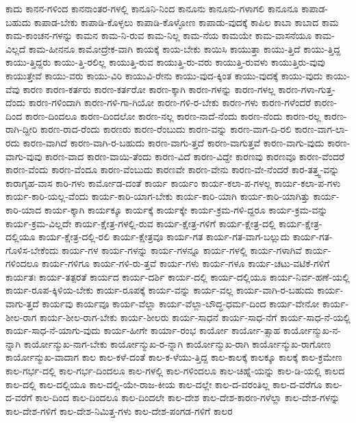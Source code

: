 {ಕಾದು
ಕಾನನ-ಗಳಿಂದ
ಕಾನನಾಂತರ-ಗಳಲ್ಲಿ
ಕಾನೂನಿ-ನಿಂದ
ಕಾನೂನು
ಕಾನೂನು-ಗಳಾಗಲಿ
ಕಾನೂನೂ
ಕಾಪಾಡ-ಬಹುದು
ಕಾಪಾಡ-ಬೇಕು
ಕಾಪಾಡಿ-ಕೊಳ್ಳಲು
ಕಾಪಾಡಿ-ಕೊಳ್ಳೋಣ
ಕಾಪಾಡು-ವುದಕ್ಕೆ
ಕಾಪಿಲ
ಕಾಬಾ
ಕಾಬಾದ
ಕಾಮ
ಕಾಮ-ಕಾಂಚನ-ಗಳನ್ನು
ಕಾಮನ
ಕಾಮ-ನಿ-ರುವ
ಕಾಮ-ನಿಲ್ಲ
ಕಾಮ-ನೆಯ
ಕಾಮಯೇ
ಕಾಮ-ವಾಸನೆಯೂ
ಕಾಮ-ವಿಲ್ಲದೆ
ಕಾಮ-ಹೀನನೂ
ಕಾಮೋದ್ರೇಕ-ವಾಗಿ
ಕಾಯಕ್ಕೆ
ಕಾಯ-ಬೇಕು
ಕಾಯಿಸಿ
ಕಾಯುತ್ತಾ
ಕಾಯು-ತ್ತಿದೆ
ಕಾಯು-ತ್ತಿದ್ದ
ಕಾಯು-ತ್ತಿದ್ದರು
ಕಾಯು-ತ್ತಿ-ರಲಿಲ್ಲ
ಕಾಯುತ್ತಿ-ರುವ
ಕಾಯುತ್ತಿ-ರು-ವರು
ಕಾಯುತ್ತಿ-ರುವಳು
ಕಾಯುತ್ತಿರು-ವುವು
ಕಾಯುತ್ತೇವೆ
ಕಾಯು-ವರು
ಕಾಯು-ವಿರಿ
ಕಾಯುವಿ-ರೇನು
ಕಾಯು-ವುದ-ಕ್ಕಿಂತ
ಕಾಯು-ವುದಕ್ಕೆ
ಕಾಯು-ವುದು
ಕಾಯು-ವೆವು
ಕಾರಣ
ಕಾರಣ-ಕರ್ತರು
ಕಾರಣ-ಕರ್ತರೋ
ಕಾರಣ-ಕ್ಕಾಗಿ
ಕಾರಣ-ಗಳನ್ನು
ಕಾರಣ-ಗಳಲ್ಲ
ಕಾರಣ-ಗಳಾ-ಗುತ್ತ-ದೆಂದು
ಕಾರಣ-ಗಳಿಂದಾಗಿ
ಕಾರಣ-ಗಳಿ-ಗಾ-ಗಿಯೋ
ಕಾರಣ-ಗಳಿ-ರ-ಬೇಕು
ಕಾರಣ-ಗಳು
ಕಾರಣ-ಗಳೆಂದರೆ
ಕಾರಣ-ದಿಂದ
ಕಾರಣ-ದಿಂದಲೂ
ಕಾರಣ-ದಿಂದಲೋ
ಕಾರಣ-ನಲ್ಲ
ಕಾರಣ-ನಾದೆ-ನೆಂದು
ಕಾರಣ-ನೆಂದು
ಕಾರಣ-ರಲ್ಲ
ಕಾರಣ-ರಾಗಿ-ದ್ದೀರಿ
ಕಾರಣ-ರಾದ-ರೆಂದು
ಕಾರಣರು
ಕಾರಣ-ರೆಂಬುದು
ಕಾರಣ-ವನ್ನು
ಕಾರಣ-ವಾಗ-ದಿ-ರಲಿ
ಕಾರಣ-ವಾಗ-ಲಾ-ರದು
ಕಾರಣ-ವಾಗಿದೆ
ಕಾರಣ-ವಾಗಿ-ರ-ಬಹುದು
ಕಾರಣ-ವಾಗು-ತ್ತದೆ
ಕಾರಣ-ವಾಗುತ್ತವೆ
ಕಾರಣ-ವಾಗು-ವುದು
ಕಾರಣ-ವಾಗು-ವುವು
ಕಾರಣ-ವಾದ
ಕಾರಣ-ವಾಯಿ-ತೆಂದು
ಕಾರಣ-ವಿದೆ
ಕಾರಣ-ವಿದ್ದೇ
ಕಾರಣವು
ಕಾರಣವೂ
ಕಾರಣ-ವೆಂದರೆ
ಕಾರಣ-ವೆಂದು
ಕಾರಣ-ವೆಂದೂ
ಕಾರಣ-ವೆಂಬುದು
ಕಾರಣವೇ
ಕಾರಣ-ವೇನು
ಕಾರಣ-ವೇ-ನೆಂದರೆ
ಕಾರ-ತತ್ತ್ವ-ವನ್ನು
ಕಾರಾಗೃಹ-ವಾಸ
ಕಾರಿ-ಗಳು
ಕಾರ್ಮೋಡ-ದಂತೆ
ಕಾರ್ಯ
ಕಾರ್ಯಂ
ಕಾರ್ಯ-ಕಲಾ-ಪ-ಗಳಲ್ಲ
ಕಾರ್ಯ-ಕಲಾ-ಪ-ಗಳು
ಕಾರ್ಯ-ಕಾರಿ-ಯಲ್ಲ-ವೆಂದು
ಕಾರ್ಯ-ಕಾರಿ-ಯಾಗ-ಬೇಕು
ಕಾರ್ಯ-ಕಾರಿ-ಯಾಗಿ
ಕಾರ್ಯ-ಕಾರಿ-ಯಾಗಿತ್ತು
ಕಾರ್ಯ-ಕಾರಿ-ಯಾದ
ಕಾರ್ಯ-ಕ್ಕಾಗಿ
ಕಾರ್ಯಕ್ಕೂ
ಕಾರ್ಯಕ್ಕೆ
ಕಾರ್ಯಕ್ಕೇ
ಕಾರ್ಯ-ಕ್ರಮ-ಗಳಿ-ದ್ದರೂ
ಕಾರ್ಯ-ಕ್ರಮ-ವನ್ನು
ಕಾರ್ಯ-ಕ್ರಮ-ವಿಲ್ಲದೇ
ಕಾರ್ಯ-ಕ್ಷೇತ್ರ-ಗಳಲ್ಲಿ-ರುವ
ಕಾರ್ಯ-ಕ್ಷೇತ್ರ-ಗಳಿಗೆ
ಕಾರ್ಯ-ಕ್ಷೇತ್ರ-ದಲ್ಲಿ
ಕಾರ್ಯ-ಕ್ಷೇತ್ರ-ದಲ್ಲಿಯೂ
ಕಾರ್ಯ-ಕ್ಷೇತ್ರ-ದಲ್ಲಿ-ರಲಿ
ಕಾರ್ಯ-ಕ್ಷೇತ್ರವೂ
ಕಾರ್ಯ-ಗತ
ಕಾರ್ಯ-ಗತ-ವಾಗ-ಬಲ್ಲುದು
ಕಾರ್ಯ-ಗತ-ಗೊಳಿಸ-ಬೇಕೆಂದು
ಕಾರ್ಯ-ಗಳ
ಕಾರ್ಯ-ಗಳನ್ನು
ಕಾರ್ಯ-ಗಳನ್ನೂ
ಕಾರ್ಯ-ಗಳಲ್ಲಿ
ಕಾರ್ಯ-ಗಳಾಗಿವೆ
ಕಾರ್ಯ-ಗಳಿಂದಲೂ
ಕಾರ್ಯ-ಗಳಿಗೂ
ಕಾರ್ಯ-ಗಳಿ-ರು-ತ್ತವೆ
ಕಾರ್ಯ-ಗಳು
ಕಾರ್ಯ-ಗಳೂ
ಕಾರ್ಯ-ಚಟು-ವಟಿಕೆ-ಗಳಿಗೆ
ಕಾರ್ಯತಃ
ಕಾರ್ಯ-ತತ್ಪರತೆ
ಕಾರ್ಯದ
ಕಾರ್ಯ-ದರ್ಶಿ
ಕಾರ್ಯ-ದಲ್ಲಿ
ಕಾರ್ಯ-ದಲ್ಲಿಯೂ
ಕಾರ್ಯ-ನಿರ್ವ-ಹಣೆ-ಯಲ್ಲಿ
ಕಾರ್ಯ-ರೂಪ-ಕ್ಕಿಳಿಯ-ಬೇಕು
ಕಾರ್ಯ-ರೂಪಕ್ಕೆ
ಕಾರ್ಯ-ವನ್ನು
ಕಾರ್ಯ-ವಲ್ಲ
ಕಾರ್ಯ-ವಾಗಿ-ರ-ಬಹುದು
ಕಾರ್ಯ-ವಾಗು-ತ್ತದೆ
ಕಾರ್ಯವು
ಕಾರ್ಯವೂ
ಕಾರ್ಯ-ವೆಲ್ಲಾ
ಕಾರ್ಯ-ವೆಲ್ಲಾ-ಬೌದ್ಧ-ಧರ್ಮ-ದಿಂದ
ಕಾರ್ಯ-ವೇನೋ
ಕಾರ್ಯ-ಶೀಲ-ರಾಗ
ಕಾರ್ಯ-ಶೀಲ-ರಾಗ-ಬೇಕು
ಕಾರ್ಯ-ಶೀಲರು
ಕಾರ್ಯ-ಸಾಧನೆ
ಕಾರ್ಯ-ಸಾಧ-ನೆಗೆ
ಕಾರ್ಯ-ಸಾಧ-ನೆ-ಯಲ್ಲಿ
ಕಾರ್ಯ-ಸಾಧ-ನೆ-ಯಾಗು-ವುದು
ಕಾರ್ಯ-ಹೀಗೇ
ಕಾರ್ಯಾ-ರಂಭ
ಕಾರ್ಯೋ
ಕಾರ್ಯೋ-ತ್ಸಾಹ
ಕಾರ್ಯೋನ್ಮುಖ-ನ-ನ್ನಾಗಿ
ಕಾರ್ಯೋನ್ಮುಖ-ನಾಗ-ಬೇಕು
ಕಾರ್ಯೋನ್ಮುಖ-ರ-ನ್ನಾಗಿ
ಕಾರ್ಯೋನ್ಮುಖ-ರಾಗಿ
ಕಾರ್ಯೋನ್ಮುಖ-ರಾಗೋಣ
ಕಾರ್ಯೋನ್ಮುಖ-ವಾದಾಗ
ಕಾಲ
ಕಾಲ-ಕಳೆ-ದಂತೆ
ಕಾಲ-ಕ-ಳೆಯು-ತ್ತಿದ್ದ
ಕಾಲ-ಕಾಲಕ್ಕೆ
ಕಾಲಕ್ಕೂ
ಕಾಲಕ್ಕೆ
ಕಾಲ-ಕ್ರಮೇಣ
ಕಾಲ-ಗರ್ಭ-ದಲ್ಲಿ
ಕಾಲ-ಗರ್ಭ-ದಿಂದಲೂ
ಕಾಲ-ಗಳಲ್ಲಿ
ಕಾಲ-ಗಳಿಂದಲೂ
ಕಾಲ-ಚಿಹ್ನೆ-ಯನ್ನು
ಕಾಲ-ಡಿ-ಯಲ್ಲಿ
ಕಾಲದ
ಕಾಲ-ದಲ್ಲಿ
ಕಾಲ-ದಲ್ಲಿಯೂ
ಕಾಲ-ದಲ್ಲಿ-ಯೇ-ರಾಜ-ಕೀಯ
ಕಾಲ-ದಲ್ಲೇ
ಕಾಲ-ದ-ವರಂತಿಲ್ಲ
ಕಾಲ-ದ-ವರೆಗೂ
ಕಾಲ-ದ-ವರೆಗೆ
ಕಾಲ-ದಿಂದ
ಕಾಲ-ದಿಂದಲೂ
ಕಾಲ-ದಿಂದಲೇ
ಕಾಲ-ದೇಶ
ಕಾಲ-ದೇಶ-ಕಾರಣ-ಗಳೆಲ್ಲಾ
ಕಾಲ-ದೇಶ-ಗಳನ್ನು
ಕಾಲ-ದೇಶ-ಗಳಿಗೆ
ಕಾಲ-ದೇಶ-ನಿಮಿತ್ತ-ಗಳು
ಕಾಲ-ದೇಶ-ಪಂಗಡ-ಗಳಿಗೆ
ಕಾಲರ
}
